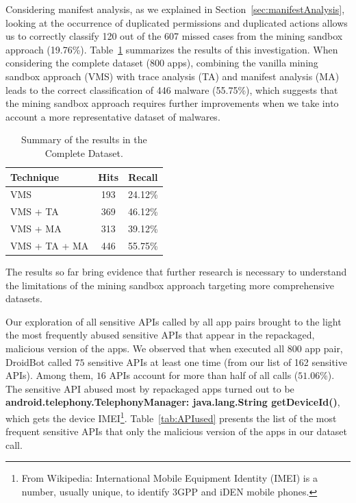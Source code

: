 Considering
manifest analysis, as we explained in Section~\ref{sec:manifestAnalysis},
looking at the occurrence of duplicated permissions and duplicated 
actions allows us to correctly classify \num{120} out of the \num{607} missed cases
from the mining sandbox approach (\num{19.76}\%).                                   
Table~\ref{tab:mfa-complete} summarizes the results of this investigation. When considering the 
complete dataset (\num{800} apps), combining the vanilla
mining sandbox approach (VMS) with trace analysis (TA) and
manifest analysis (MA) leads to the correct classification
of \num{446} malware (\num{55.75}\%), which suggests that
the mining sandbox approach requires further improvements when
we take into account a more representative dataset
of malwares. 


\begin{table}[ht]
  \caption{Summary of the results in the Complete Dataset.}
  \centering
  \begin{small}
  \begin{tabular}{lcc}\toprule
  Technique      & Hits & Recall \\ \midrule 
  VMS            & 193  & \num{24.12}\% \\ 
  VMS + TA       & 369  & \num{46.12}\%  \\
  VMS + MA       & 313  & \num{39.12}\% \\
  VMS + TA + MA  & 446  & \num{55.75}\% \\  \bottomrule
  \end{tabular}
  \end{small}
 \label{tab:mfa-complete}
\end{table}

\begin{obs}{5}{}
  The results so far bring evidence that
  further research is necessary to understand
  the limitations of the mining sandbox approach
  targeting more comprehensive datasets.
\end{obs}

Our exploration of all sensitive APIs called by all app pairs brought to the light the most frequently abused sensitive APIs that
appear in the repackaged, malicious version of the apps. We observed that when executed all 800 app pair, DroidBot called $75$ sensitive APIs at least one time (from our list of 162 sensitive APIs). Among them, $16$ APIs account for more than half of all calls ($51.06$\%).
The sensitive API abused most by repackaged apps turned out to be \textbf{android.telephony.TelephonyManager: java.lang.String getDeviceId()}, which gets the device
IMEI\footnote{From Wikipedia: International Mobile Equipment Identity (IMEI) is a number, usually unique, to identify 3GPP and iDEN mobile phones.}.
Table~\ref{tab:APIused} presents the list of the most frequent sensitive APIs that only the malicious
version of the apps in our dataset call.


